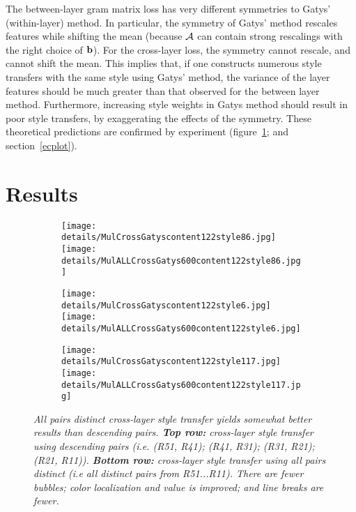 \documentclass[runningheads]{llncs}
\newcommand{\vect}[1]{{\bf {#1}}}
\newcommand{\matx}[1]{{\cal {#1}}}
\begin{document}
 The between-layer gram matrix loss has very different symmetries to Gatys'
(within-layer) method.  In particular, the symmetry of Gatys' method rescales
features while shifting the mean (because $\matx{A}$ can contain
strong rescalings with the right choice of $\vect{b}$).   For the
cross-layer loss, the symmetry cannot rescale, and cannot shift the
mean.   This implies that, if one constructs numerous style
transfers with the same style using Gatys' method, the variance of the layer features should be much greater than that
observed for the between layer method.  Furthermore, increasing style weights in Gatys method should result in poor
style transfers, by exaggerating the effects of the symmetry.  These theoretical predictions are confirmed by experiment (figure~\ref{}; and
section~\ref{ecplot}).


\section{Results\label{results}}


\begin{figure}[!htbp]
\centering
\small 
\begin{subfigure}[t]{0.3\linewidth}
    \texttt{[image: details/MulCrossGatyscontent122style86.jpg]}
    \texttt{[image: details/MulALLCrossGatys600content122style86.jpg]}
\end{subfigure}
\begin{subfigure}[t]{0.3\linewidth}
    \texttt{[image: details/MulCrossGatyscontent122style6.jpg]}
    \texttt{[image: details/MulALLCrossGatys600content122style6.jpg]}
\end{subfigure}
\begin{subfigure}[t]{0.3\linewidth}
    \texttt{[image: details/MulCrossGatyscontent122style117.jpg]}
    \texttt{[image: details/MulALLCrossGatys600content122style117.jpg]}
\end{subfigure}
\caption{\em All pairs distinct cross-layer style transfer yields somewhat better results than descending pairs.  {\bf
    Top row:} cross-layer style transfer using descending pairs (i.e. (R51, R41); (R41, R31); (R31, R21); (R21, R11)).
  {\bf Bottom row:}  cross-layer style transfer using all pairs distinct (i.e  all distinct pairs from R51...R11).
There are fewer bubbles; color localization and value is improved; and line breaks are fewer.
  \label{fig:CGALL}}
\end{figure}
\end{document}
